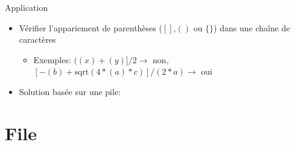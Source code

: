 \begin{frame}{Application}
\begin{itemize}
\item Vérifier l'appariement de parenthèses ($[]$,$()$ ou $\{\}$) dans une chaîne de caractères
\begin{itemize}
\item Exemples: $((x)+(y)]/2\rightarrow$ non, $[- (b) + \mbox{sqrt}(4*(a)*c)]/ (2*a) \rightarrow$ oui
\end{itemize}
\item Solution basée sur une pile:
\begin{center}
\begin{small}
\end{small}
\end{center}
\end{itemize}
\end{frame}

\section{File}

